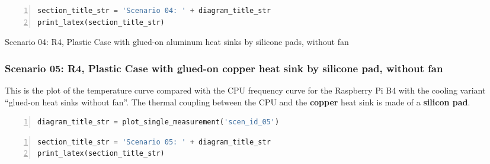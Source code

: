 \documentclass[10pt,parskip=half,
toc=sectionentrywithdots,
bibliography=totocnumbered,
captions=tableheading,numbers=noendperiod]{scrartcl}
\begin{document}
\begin{figure}[H]\begin{center}\end{center}\end{figure}

\begin{lstlisting}[language=Python,numbers=left,xleftmargin=20pt,xrightmargin=5pt,belowskip=5pt,aboveskip=5pt]
section_title_str = 'Scenario 04: ' + diagram_title_str
print_latex(section_title_str)
\end{lstlisting}

\begin{table}[H]
\centering
\begin{adjustbox}{max width=\textwidth}
Scenario 04: R4, Plastic Case with glued-on aluminum heat sinks by silicone pads, without fan
\end{adjustbox}
\end{table}

\hypertarget{scenario-05-r4-plastic-case-with-glued-on-copper-heat-sink-by-silicone-pad-without-fan}{%
\subsubsection{Scenario 05: R4, Plastic Case with glued-on copper heat
sink by silicone pad, without
fan}\label{scenario-05-r4-plastic-case-with-glued-on-copper-heat-sink-by-silicone-pad-without-fan}}

This is the plot of the temperature curve compared with the CPU
frequency curve for the Raspberry Pi B4 with the cooling variant
``glued-on heat sinks without fan''. The thermal coupling between the
CPU and the \textbf{copper} heat sink is made of a \textbf{silicon pad}.

\begin{lstlisting}[language=Python,numbers=left,xleftmargin=20pt,xrightmargin=5pt,belowskip=5pt,aboveskip=5pt]
diagram_title_str = plot_single_measurement('scen_id_05')
\end{lstlisting}

\begin{figure}[H]\begin{center}\end{center}\end{figure}

\begin{lstlisting}[language=Python,numbers=left,xleftmargin=20pt,xrightmargin=5pt,belowskip=5pt,aboveskip=5pt]
section_title_str = 'Scenario 05: ' + diagram_title_str
print_latex(section_title_str)
\end{lstlisting}
\end{document}
